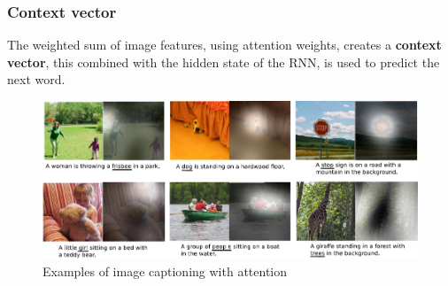 \subsubsection{Context vector}
The weighted sum of image features, using attention weights, creates a \textbf{context vector}, this combined with the hidden state of the RNN, is used to predict the next word.

\begin{figure}
    \centering
    \includegraphics[scale=0.5]{img/img_caption_3,jpg.png}
    \caption{Examples of image captioning with attention}
\end{figure}

